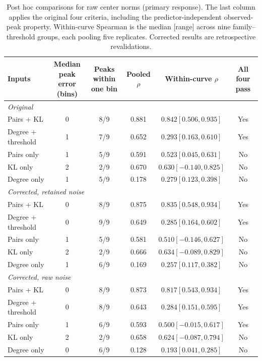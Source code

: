 \begin{table}[htbp]
\centering
\small
\setlength{\tabcolsep}{6pt}
\caption{Post hoc comparisons for raw center norms (primary response). The last column applies the original four criteria, including the predictor-independent observed-peak property. Within-curve Spearman is the median [range] across nine family--threshold groups, each pooling five replicates. Corrected results are retrospective revalidations.}
\label{tab:prospective-baselines}
\begin{tabular}{lccccc}
\toprule
Inputs & \shortstack{Median peak\\error (bins)} & \shortstack{Peaks within\\one bin} & Pooled $\rho$ & Within-curve $\rho$ & All four pass \\
\midrule
\multicolumn{6}{l}{\textit{Original}} \\
Pairs + KL & 0 & 8/9 & 0.881 & $0.842 [0.506, 0.935]$ & Yes \\
Degree + threshold & 1 & 7/9 & 0.652 & $0.293 [0.163, 0.610]$ & Yes \\
Pairs only & 1 & 5/9 & 0.591 & $0.523 [0.045, 0.631]$ & No \\
KL only & 2 & 2/9 & 0.670 & $0.630 [-0.140, 0.825]$ & No \\
Degree only & 1 & 5/9 & 0.178 & $0.279 [0.123, 0.398]$ & No \\
\midrule
\multicolumn{6}{l}{\textit{Corrected, retained noise}} \\
Pairs + KL & 0 & 8/9 & 0.875 & $0.835 [0.548, 0.934]$ & Yes \\
Degree + threshold & 0 & 9/9 & 0.649 & $0.285 [0.164, 0.602]$ & Yes \\
Pairs only & 1 & 5/9 & 0.581 & $0.510 [-0.146, 0.627]$ & No \\
KL only & 2 & 2/9 & 0.666 & $0.634 [-0.089, 0.829]$ & No \\
Degree only & 1 & 6/9 & 0.169 & $0.257 [0.117, 0.382]$ & No \\
\midrule
\multicolumn{6}{l}{\textit{Corrected, raw noise}} \\
Pairs + KL & 0 & 8/9 & 0.873 & $0.817 [0.543, 0.934]$ & Yes \\
Degree + threshold & 0 & 8/9 & 0.643 & $0.284 [0.151, 0.595]$ & Yes \\
Pairs only & 1 & 6/9 & 0.593 & $0.500 [-0.015, 0.617]$ & Yes \\
KL only & 2 & 2/9 & 0.658 & $0.624 [-0.087, 0.794]$ & No \\
Degree only & 0 & 6/9 & 0.128 & $0.193 [0.041, 0.285]$ & No \\
\bottomrule
\end{tabular}
\end{table}
